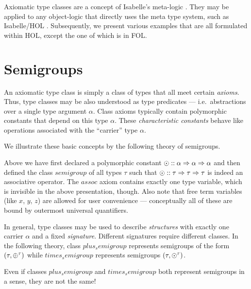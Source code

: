 Axiomatic type classes are a concept of Isabelle's meta-logic
\cite{paulson-isa-book,Wenzel:1997:TPHOL}.  They may be applied to any
object-logic that directly uses the meta type system, such as Isabelle/HOL
\cite{isabelle-HOL}.  Subsequently, we present various examples that are all
formulated within HOL, except the one of  which is in
FOL.

\section{Semigroups}

An axiomatic type class is simply a class of types that all meet certain
\emph{axioms}. Thus, type classes may be also understood as type predicates
--- i.e.\ abstractions over a single type argument $\alpha$.  Class axioms
typically contain polymorphic constants that depend on this type $\alpha$.
These \emph{characteristic constants} behave like operations associated with
the ``carrier'' type $\alpha$.

We illustrate these basic concepts by the following theory of semigroups.

\bigskip

\bigskip

\noindent
Above we have first declared a polymorphic constant $\odot :: \alpha \Rightarrow
\alpha \Rightarrow \alpha$ and then defined the class $semigroup$ of all types $\tau$
such that $\odot :: \tau \Rightarrow \tau \Rightarrow \tau$ is indeed an associative
operator.  The $assoc$ axiom contains exactly one type variable, which is
invisible in the above presentation, though.  Also note that free term
variables (like $x$, $y$, $z$) are allowed for user convenience ---
conceptually all of these are bound by outermost universal quantifiers.

\medskip

In general, type classes may be used to describe \emph{structures} with
exactly one carrier $\alpha$ and a fixed \emph{signature}.  Different
signatures require different classes. In the following theory, class
$plus_semigroup$ represents semigroups of the form $(\tau, \oplus^\tau)$ while
$times_semigroup$ represents semigroups $(\tau, \odot^\tau)$.

\bigskip

\bigskip

\noindent Even if classes $plus_semigroup$ and $times_semigroup$ both represent
semigroups in a sense, they are not the same!




